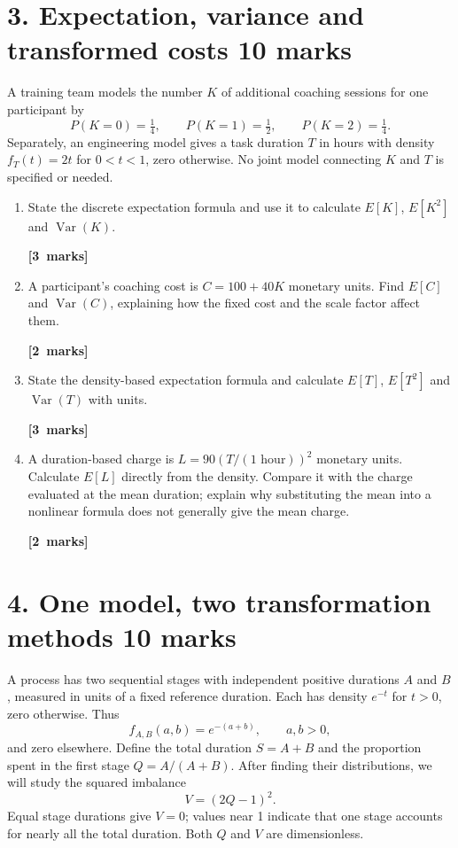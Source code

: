 \documentclass[11pt,a4paper]{article}
\newcommand{\pts}[1]{\par\nobreak\hfill\mbox{\textbf{[#1 marks]}}}
\begin{document}
\section*{3. Expectation, variance and transformed costs \hfill 10 marks}
A training team models the number $K$ of additional coaching sessions for one participant by
\[
P(K=0)=\tfrac14,\qquad P(K=1)=\tfrac12,\qquad P(K=2)=\tfrac14.
\]
Separately, an engineering model gives a task duration $T$ in hours with density $f_T(t)=2t$ for $0<t<1$, zero otherwise. No joint model connecting $K$ and $T$ is specified or needed.
\begin{enumerate}
\item State the discrete expectation formula and use it to calculate $E[K]$, $E[K^2]$ and $\operatorname{Var}(K)$. \pts{3}
\item A participant's coaching cost is $C=100+40K$ monetary units. Find $E[C]$ and $\operatorname{Var}(C)$, explaining how the fixed cost and the scale factor affect them. \pts{2}
\item State the density-based expectation formula and calculate $E[T]$, $E[T^2]$ and $\operatorname{Var}(T)$ with units. \pts{3}
\item A duration-based charge is $L=90(T/(1\text{ hour}))^2$ monetary units. Calculate $E[L]$ directly from the density. Compare it with the charge evaluated at the mean duration; explain why substituting the mean into a nonlinear formula does not generally give the mean charge. \pts{2}
\end{enumerate}

\clearpage
\section*{4. One model, two transformation methods \hfill 10 marks}
A process has two sequential stages with independent positive durations $A$ and $B$, measured in units of a fixed reference duration. Each has density $e^{-t}$ for $t>0$, zero otherwise. Thus
\[f_{A,B}(a,b)=e^{-(a+b)},\qquad a,b>0,\]
and zero elsewhere. Define the total duration $S=A+B$ and the proportion spent in the first stage $Q=A/(A+B)$. After finding their distributions, we will study the squared imbalance
\[V=(2Q-1)^2.\]
Equal stage durations give $V=0$; values near 1 indicate that one stage accounts for nearly all the total duration. Both $Q$ and $V$ are dimensionless.
\end{document}
